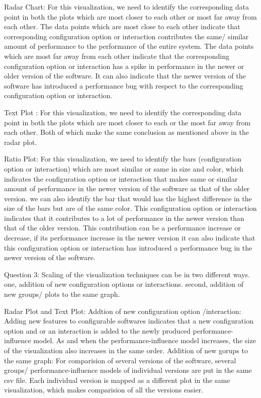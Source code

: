  Radar Chart: For this visualization, we need to identify the corresponding data point in both the plots which are most closer to each other or most far away from each other. The data points which are most close to each other indicate that  corresponding configuration option or interaction contributes the same/ similar amount of performance to the performance of the entire system. The data points which are most far away from each other indicate  that the corresponding configuration option or interaction has a spike in performance in the newer or older version of the software. It can also indicate that the newer version of the software has introduced a performance bug with respect to the corresponding configuration option or interaction. 


 Text Plot : For this visualization, we need to identify the corresponding data point in both the plots which are most closer to each or the most far away from each other. Both of which make the same conclusion as mentioned above in the radar plot.

 Ratio Plot: For this visualization, we need to identify the bars (configuration option or interaction) which are most similar or same in size and color, which indicates the configuration option or interaction that makes same or similar amount of performance in the newer version of the software as that of the older version. we can also identify the bar that would has the highest difference in the size of the bars but are of the same color. This configuration option or interaction indicates that it contributes to a lot of performance in the newer version than that of the older version. This contribution can be a performance increase or decrease, if its performance increase in the newer version it can also indicate that this configuration option or interaction has introduced a performance bug in the newer version of the software.

 Question 3: Scaling of the visualization techniques can be in two different ways. one, addition of new configuration options or interactions. second, addition of new groups/ plots to the same graph.

Radar Plot and Text Plot: 
Addtion of new configuration option /interaction: Adding new features to configurable softwares indicates that a new configuration option and or an interaction is added to the newly produced performance-influence model. As and when the performance-influence model increases, the size of the visualization also increases in the same order.
Addition of new gorups to the same graph: For comparision of several versions of the software, several groups/ performance-influence models of individual versions are put in the same csv file. Each individual version is mapped as a different plot in the same visualization, which makes comparision of all the versions easier.

